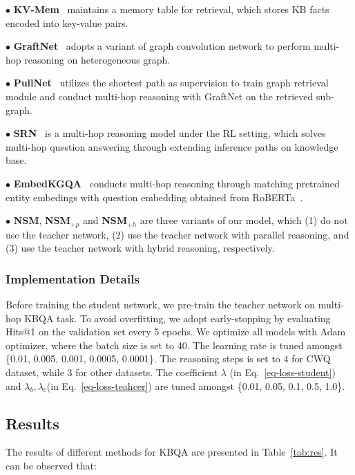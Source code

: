     $\bullet$ \textbf{KV-Mem}~\cite{KVMem-EMNLP-2016} maintains a memory table for retrieval, which stores KB facts encoded into key-value pairs.
	


	$\bullet$ \textbf{GraftNet}~\cite{GraftNet-EMNLP-2018} adopts a variant of graph convolution network to perform multi-hop reasoning on heterogeneous graph.
	
	$\bullet$ \textbf{PullNet}~\cite{PullNet-EMNLP-2019} utilizes the shortest path as supervision to train graph retrieval module and conduct multi-hop reasoning with GraftNet on the retrieved sub-graph.


	$\bullet$ \textbf{SRN}~\cite{SRN-WSDM-2020} is a multi-hop reasoning model under the RL setting, which solves multi-hop question answering through extending inference paths on knowledge base.


	$\bullet$ \textbf{EmbedKGQA}~\cite{Saxena-ACL-2020} conducts multi-hop reasoning through matching pretrained entity embedings with question embedding obtained from RoBERTa~\cite{RoBERTa-Liu-2019}.
	
$\bullet$ \textbf{NSM}, \textbf{NSM}$_{+p}$ and \textbf{NSM}$_{+h}$ are three variants of our model, which (1) do not use the teacher network, (2) use the teacher network with parallel reasoning, and (3) use the teacher network with hybrid reasoning, respectively.


\subsubsection{Implementation Details}
Before training the student network, we pre-train the teacher network on multi-hop KBQA task. To avoid overfitting, we adopt early-stopping by evaluating Hits@1 on the validation set every 5 epochs. We optimize all models with Adam optimizer, where the batch size is set to 40. The learning rate is tuned amongst \{0.01, 0.005, 0.001, 0.0005, 0.0001\}. The reasoning steps is set to $4$ for CWQ dataset, while $3$ for other datasets. 
The coefficient $\lambda$ (in Eq.~\ref{eq-loss-student}) and $\lambda_b, \lambda_c$(in Eq.~\ref{eq-loss-teahcer}) are tuned amongst \{0.01, 0.05, 0.1, 0.5, 1.0\}.

\subsection{Results}

The results of different methods for KBQA are presented in Table~\ref{tab:res}. It can be observed that:


